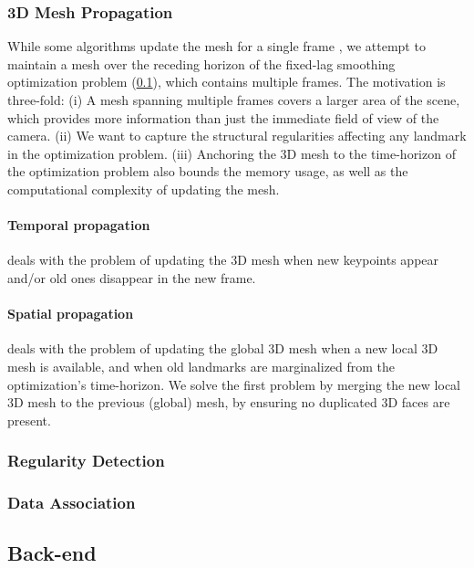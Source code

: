 \subsubsection{3D Mesh Propagation}
While some algorithms update the mesh for a single frame \cite{Greene17iccv,Teixeira16iros}, we attempt to maintain a mesh over the receding horizon of the fixed-lag smoothing optimization problem (\cref{ssec:backend}), which contains multiple frames.
The motivation is three-fold: (i) A mesh spanning multiple frames covers a larger area of the scene, which provides more information than just the immediate field of view of the camera. (ii) We want to capture the structural regularities affecting any landmark in the optimization problem.
(iii) Anchoring the 3D mesh to the time-horizon of the optimization problem also bounds the memory usage, as well as the computational complexity of updating the mesh.

\paragraph{Temporal propagation} deals with the problem of updating the 3D mesh when new keypoints appear and/or old ones disappear in the new frame.

\paragraph{Spatial propagation} deals with the problem of updating the global 3D mesh when a new local 3D mesh is available, and when old landmarks are marginalized from the optimization's time-horizon.
We solve the first problem by merging the new local 3D mesh to the previous (global) mesh, by ensuring no duplicated 3D faces are present.

\subsubsection{Regularity Detection}
\label{sssec:regularity_detection}

\subsubsection{Data Association}
\label{sssec:data_association}

\subsection{Back-end}
\label{ssec:backend}

